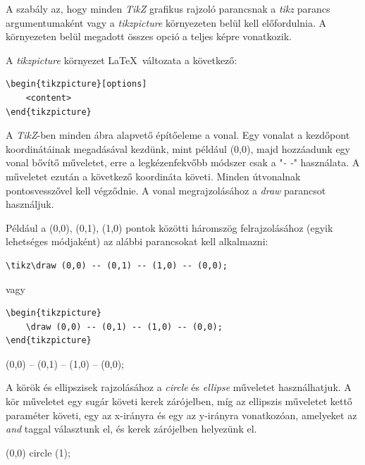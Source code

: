 A szabály az, hogy minden \textit{TikZ} grafikus rajzoló parancsnak a \textit{tikz} parancs argumentumaként vagy a \textit{tikzpicture} környezeten belül kell előfordulnia. A környezeten belül megadott összes opció a teljes képre vonatkozik.

A \textit{tikzpicture} környezet \LaTeX\ változata a következő:

\begin{lstlisting}[style=latex]
\begin{tikzpicture}[options]
    <content>
\end{tikzpicture}
\end{lstlisting}


A \textit{TikZ}-ben minden ábra alapvető építőeleme a vonal. Egy vonalat a kezdőpont koordinátáinak megadásával kezdünk, mint például (0,0), majd hozzáadunk egy vonal bővítő műveletet, erre a legkézenfekvőbb módszer csak a "\textit{- -}" használata. A műveletet ezután a következő koordináta követi. Minden útvonalnak pontosvesszővel kell végződnie. A vonal megrajzolásához a \textit{draw} parancsot használjuk.

Például a (0,0), (0,1), (1,0)  pontok közötti háromszög felrajzolásához (egyik lehetséges módjaként) az alábbi parancsokat kell alkalmazni:

\begin{lstlisting}[style=latex]
\tikz\draw (0,0) -- (0,1) -- (1,0) -- (0,0);
\end{lstlisting}

vagy

\begin{lstlisting}[style=latex]
\begin{tikzpicture}
    \draw (0,0) -- (0,1) -- (1,0) -- (0,0);
\end{tikzpicture}
\end{lstlisting}

\begin{tikzcode}
\draw (0,0) -- (0,1) -- (1,0) -- (0,0);
\end{tikzcode}


A körök és ellipszisek rajzolásához a \textit{circle} és \textit{ellipse} műveletet használhatjuk. A kör műveletet egy sugár követi kerek zárójelben, míg az ellipszis műveletet kettő paraméter követi, egy az x-irányra és egy az y-irányra vonatkozóan, amelyeket az \textit{and} taggal választunk el, és kerek zárójelben helyezünk el. 

\begin{tikzcode}
\draw (0,0) circle (1);
\end{tikzcode}


